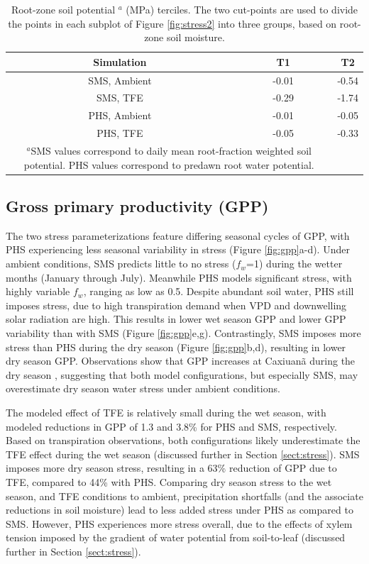 \documentclass[draft,linenumbers]{agujournal}
\begin{document}
\begin{table}
\caption{Root-zone soil potential $^a$ (MPa) terciles. The two cut-points are used to divide the points in each subplot of Figure \ref{fig:stress2} into three groups, based on root-zone soil moisture.}
\label{tab:tercile}
\centering
\begin{tabular}{c c c }
Simulation & T1 & T2 \\
\hline
SMS, Ambient & -0.01 & -0.54 \\
SMS, TFE & -0.29 & -1.74 \\
PHS, Ambient & -0.01 & -0.05 \\
PHS, TFE & -0.05 & -0.33 \\
\hline
\multicolumn{2}{p{.8\linewidth}}{$^{a}$SMS values correspond to daily mean root-fraction weighted soil potential.
PHS values correspond to predawn root water potential.}
\end{tabular}
\end{table}


\subsection{Gross primary productivity (GPP)}

The two stress parameterizations feature differing seasonal cycles of GPP, with PHS experiencing less seasonal variability in stress (Figure \ref{fig:gpp}a-d).
Under ambient conditions, SMS predicts little to no stress ($f_w$=1) during the wetter months (January through July).
Meanwhile PHS models significant stress, with highly variable $f_w$, ranging as low as 0.5.
Despite abundant soil water, PHS still imposes stress, due to high transpiration demand when VPD and downwelling solar radiation are high.
This results in lower wet season GPP and lower GPP variability than with SMS (Figure \ref{fig:gpp}e,g).
Contrastingly, SMS imposes more stress than PHS during the dry season (Figure \ref{fig:gpp}b,d), 
resulting in lower dry season GPP.
Observations show that GPP increases at Caxiuan\~a during the dry season \citep{restrepo2017}, suggesting that both model configurations, 
but especially SMS, may overestimate dry season water stress under ambient conditions.  

The modeled effect of TFE is relatively small during the wet season, with modeled reductions in GPP of 1.3 and 3.8\% for PHS and SMS, respectively.
Based on transpiration observations, both configurations likely underestimate the TFE effect during the wet season (discussed further in Section \ref{sect:stress}).
SMS imposes more dry season stress, resulting in a 63\% reduction of GPP due to TFE, compared to 44\% with PHS.
Comparing dry season stress to the wet season, and TFE conditions to ambient, precipitation shortfalls (and the associate reductions in soil moisture) lead to less added stress under PHS as compared to SMS.
However, PHS experiences more stress overall, due to the effects of xylem tension imposed by the gradient of water potential from soil-to-leaf (discussed further in Section \ref{sect:stress}).
\end{document}
